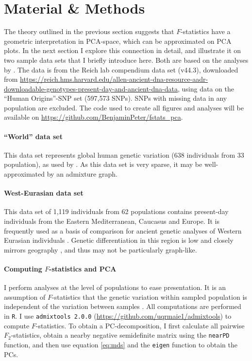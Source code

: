 \documentclass[12pt,fullpage, a4paper]{article}
\begin{document}
\section{Material \& Methods}
The theory outlined in the previous section suggests that $F$-statistics have a geometric interpretation in PCA-space, which can be approximated on PCA plots. In the next section I explore this connection in detail, and illustrate it on two sample data sets that I briefly introduce here. Both are based on the analyses by \cite{lazaridis2014}. The data is from the Reich lab compendium data set (v44.3), downloaded from \url{https://reich.hms.harvard.edu/allen-ancient-dna-resource-aadr-downloadable-genotypes-present-day-and-ancient-dna-data}, using data on the ``Human Origins''-SNP set (597,573 SNPs). SNPs with missing data in any population are excluded. The code used to create all figures and analyses will be available on \url{https://github.com/BenjaminPeter/fstats_pca}.

\paragraph{``World'' data set}
This data set represents global human genetic variation (638 individuals from 33 population), as used by \citep{lazaridis2014}. As this data set is very sparse, it may be well-approximated by an admixture graph.


\paragraph{West-Eurasian data set}
This data set of 1,119 individuals from 62 populations contains  present-day individuals from the Eastern Mediterranean, Caucasus and Europe. It is frequently used as a basis of comparison for ancient genetic analyses of Western Eurasian individuals \citep{patterson2012, lazaridis2014}. Genetic differentiation in this region is low and closely mirrors geography \citep{novembre2008}, and thus may not be particularly graph-like.


\paragraph{Computing $F$-statistics and PCA}
I perform analyses at the level of populations to ease presentation.  It is an assumption of $F$-statistics that the genetic variation within sampled population is independent of the variation between samples \citep{patterson2012}. All computations are performed in \texttt{R}. I use \texttt{admixtools 2.0.0} (\url{https://github.com/uqrmaie1/admixtools}) to compute $F$-statistics. To obtain a PC-decomposition, I first calculate all pairwise $F_2$-statistics, obtain a nearby negative semidefinite matrix using the \texttt{nearPD} function, and then use equation \ref{eq:mds} and the \texttt{eigen} function to obtain the PCs. 
\end{document}
